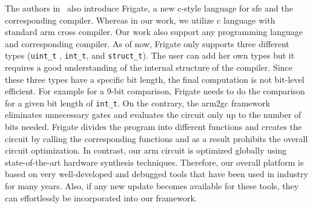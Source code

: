 The authors in~\cite{mood2016frigate} also introduce Frigate, a new \gls{c}-style language for \acrshort{sfe} and the corresponding compiler.
Whereas in our work, we utilize \gls{c} language with standard \gls{arm} cross compiler.
Our work also support any programming language and corresponding compiler.
As of now, Frigate only supports three different types (\texttt{uint\_t} , \texttt{int\_t}, and \texttt{struct\_t}).
The user can add her own types but it requires a good understanding of the internal structure of the compiler.
Since these three types have a specific bit length, the final computation is not bit-level efficient.
For example for a 9-bit comparison, Frigate needs to do the comparison for a given bit length of \texttt{int\_t}.
On the contrary, the \gls{arm2gc} framework eliminates unnecessary gates and evaluates the circuit only up to the number of bits needed.
Frigate divides the program into different functions and creates the circuit by calling the corresponding functions and as a result prohibits the overall circuit optimization.
In contrast, our \gls{arm} circuit is optimized globally using state-of-the-art hardware synthesis techniques.
Therefore, our overall platform is based on very well-developed and debugged tools that have been used in industry for many years.
Also, if any new update becomes available for these tools, they can effortlessly be incorporated into our framework.
